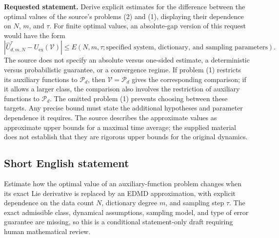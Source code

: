 \documentclass[11pt]{article}
\begin{document}
\textbf{Requested statement.} Derive explicit estimates for the difference between the optimal values of the source's problems (2) and (1), displaying their dependence on \(N\), \(m\), and \(\tau\). For finite optimal values, an absolute-gap version of this request would have the form
\[
\left|\widehat U_{d,m,N}^{\tau}-U_{\mathrm{ex}}(\mathcal V)\right|
\leq E(N,m,\tau;\text{specified system, dictionary, and sampling parameters}).
\]
The source does not specify an absolute versus one-sided estimate, a deterministic versus probabilistic guarantee, or a convergence regime. If problem (1) restricts its auxiliary functions to \(\mathcal P_d\), then \(\mathcal V=\mathcal P_d\) gives the corresponding comparison; if it allows a larger class, the comparison also involves the restriction of auxiliary functions to \(\mathcal P_d\). The omitted problem (1) prevents choosing between these targets. Any precise bound must state the additional hypotheses and parameter dependence it requires. The source describes the approximate values as approximate upper bounds for a maximal time average; the supplied material does not establish that they are rigorous upper bounds for the original dynamics.
\subsection{Short English statement}
Estimate how the optimal value of an auxiliary-function problem changes when its exact Lie derivative is replaced by an EDMD approximation, with explicit dependence on the data count \(N\), dictionary degree \(m\), and sampling step \(\tau\). The exact admissible class, dynamical assumptions, sampling model, and type of error guarantee are missing, so this is a conditional statement-only draft requiring human mathematical review.
\end{document}
